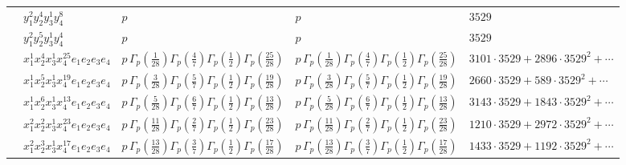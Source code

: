\documentclass[11pt]{article}
\begin{document}
\begin{table}[ht]
{\begin{tabular}{@{}lllll@{}}
 & $y_{1}^{2} y_{2}^{4} y_{3}^{1} y_{4}^{8}$ & $p \,$ & $p \,$ & $3529$ \\
 & $y_{1}^{2} y_{2}^{5} y_{3}^{1} y_{4}^{4}$ & $p \,$ & $p \,$ & $3529$ \\
 & $x_{1}^{1} x_{2}^{4} x_{3}^{1} x_{4}^{25}  e_{1} e_{2} e_{3} e_{4}$ & $p \, \Gamma_p \left( \frac{1}{28} \right) \Gamma_p \left( \frac{4}{7} \right) \Gamma_p \left( \frac{1}{2} \right) \Gamma_p \left( \frac{25}{28} \right)$ & $p \, \Gamma_p \left( \frac{1}{28} \right) \Gamma_p \left( \frac{4}{7} \right) \Gamma_p \left( \frac{1}{2} \right) \Gamma_p \left( \frac{25}{28} \right)$ & $3101{\cdot}3529{+}2896{\cdot}3529^{2}{+}\cdots$ \\
 & $x_{1}^{1} x_{2}^{5} x_{3}^{1} x_{4}^{19}  e_{1} e_{2} e_{3} e_{4}$ & $p \, \Gamma_p \left( \frac{3}{28} \right) \Gamma_p \left( \frac{5}{7} \right) \Gamma_p \left( \frac{1}{2} \right) \Gamma_p \left( \frac{19}{28} \right)$ & $p \, \Gamma_p \left( \frac{3}{28} \right) \Gamma_p \left( \frac{5}{7} \right) \Gamma_p \left( \frac{1}{2} \right) \Gamma_p \left( \frac{19}{28} \right)$ & $2660{\cdot}3529{+}589{\cdot}3529^{2}{+}\cdots$ \\
 & $x_{1}^{1} x_{2}^{6} x_{3}^{1} x_{4}^{13}  e_{1} e_{2} e_{3} e_{4}$ & $p \, \Gamma_p \left( \frac{5}{28} \right) \Gamma_p \left( \frac{6}{7} \right) \Gamma_p \left( \frac{1}{2} \right) \Gamma_p \left( \frac{13}{28} \right)$ & $p \, \Gamma_p \left( \frac{5}{28} \right) \Gamma_p \left( \frac{6}{7} \right) \Gamma_p \left( \frac{1}{2} \right) \Gamma_p \left( \frac{13}{28} \right)$ & $3143{\cdot}3529{+}1843{\cdot}3529^{2}{+}\cdots$ \\
 & $x_{1}^{2} x_{2}^{2} x_{3}^{1} x_{4}^{23}  e_{1} e_{2} e_{3} e_{4}$ & $p \, \Gamma_p \left( \frac{11}{28} \right) \Gamma_p \left( \frac{2}{7} \right) \Gamma_p \left( \frac{1}{2} \right) \Gamma_p \left( \frac{23}{28} \right)$ & $p \, \Gamma_p \left( \frac{11}{28} \right) \Gamma_p \left( \frac{2}{7} \right) \Gamma_p \left( \frac{1}{2} \right) \Gamma_p \left( \frac{23}{28} \right)$ & $1210{\cdot}3529{+}2972{\cdot}3529^{2}{+}\cdots$ \\
 & $x_{1}^{2} x_{2}^{3} x_{3}^{1} x_{4}^{17}  e_{1} e_{2} e_{3} e_{4}$ & $p \, \Gamma_p \left( \frac{13}{28} \right) \Gamma_p \left( \frac{3}{7} \right) \Gamma_p \left( \frac{1}{2} \right) \Gamma_p \left( \frac{17}{28} \right)$ & $p \, \Gamma_p \left( \frac{13}{28} \right) \Gamma_p \left( \frac{3}{7} \right) \Gamma_p \left( \frac{1}{2} \right) \Gamma_p \left( \frac{17}{28} \right)$ & $1433{\cdot}3529{+}1192{\cdot}3529^{2}{+}\cdots$ \\

\end{tabular}}
\end{table}
\end{document}
